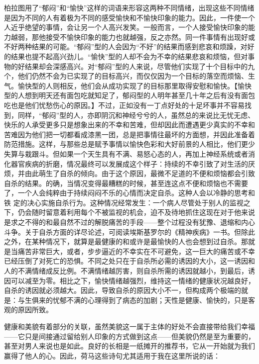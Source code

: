 \documentclass[12pt,oneside]{book}
\begin{document}
柏拉图用了“郁闷”和“愉快”这样的词语来形容这两种不同情绪，出现这些不同情绪是因为不同的人有着极为不同的感受愉快和不愉快印象的能力。因此，一件使一个人近乎绝望的事情，会让另一个人高兴发笑。一般而言，一个人接受愉快印象的能力越弱，那他接受不愉快印象的能力也就越强，反之亦然。同一件事情有出现好或不好两种结果的可能。“郁闷”型的人会因为“不好”的结果而感到悲哀和烦躁，对好的结果也提不起高兴劲儿。“愉快”型的人却不会为不幸的结果悲哀和烦恼，但对事物的好结果却会深感高兴。对“郁闷”型的人来说，尽管他们实现了十个目标中的九个，他们仍然不会为已实现了的目标高兴，而仅仅因为一个目标的落空而烦恼、生气。愉快型的人则相反，他们会从成功实现了的目标那里取得安慰和愉快。【愉快型的人想到明天还有面包吃就知足了，郁闷型的人明年甚至几十年之后有没有面包吃也是他们忧愁伤心的原因。】不过，正如没有一丁点好处的十足坏事并不容易找到，同样，“郁闷”型的人，亦即阴沉和神经兮兮的人，虽然总的来说比无忧无虑、快乐的人承受更多只是想象出来的不幸和苦难，但却因此而遭遇更少真实的不幸和苦难因为他们把一切都看成漆黑一团，总是把事情往最坏的方面想，并因此准备着防范措施。这样，与那些总是赋予事情以愉快色彩和大好前景的人相比，他们更少失算与栽跟斗。但如果一个天生具有不满、易怒心态的人，再加上神经系统或者消化器官疾病的折磨，情况最终可以发展成这个样子：持续的不幸引致了对生活的厌烦，并由此萌生了自杀的倾向。由于这个原因，最微不足道的不便和烦恼都会引致自杀的结果。的确，当情况变得最糟糕的时候，甚至连这点不便和烦恼也不需要了，一个人会纯粹由于持续闷闷不乐的心情而决定自杀。这种人会以冷静的思考和铁
定的决心实施自杀行为。这种情况经常发生：一个病人尽管处于别人的监视之下，仍会随时留意着利用每个不被监视的机会，迫不及待地抓住这现在对于他来说是求之不得的和最自然不过的解脱痛苦的手段——整个过程没有犹豫、退缩和内心斗争。关于自杀方面的详尽论述，可阅读埃斯基罗尔的《精神疾病》一书。但除此之外，在某种情况下，就算是最健康的和或许是最愉快的人也会想到过自杀。那就是当痛苦非常巨大，或者，步步逼近的不幸实在不可避免，这一巨大的痛苦或不幸已经压倒了对死亡的恐惧。不同之处只在于自杀所必需的诱因的大小，这一诱因和人的不满情绪成反比例。不满情绪越厉害，则自杀所需的诱因就越小，到最后，诱因可以减至为零。相比之下，愉快情绪越强烈，维持这一情绪的健康状况越良好，自杀的诱因就必须越大。因此，导致自杀的原因大小不一，但构成两个极端的就是：与生俱来的忧郁不满的心理得到了病态的加剧；天性是健康、愉快的，只是客观的原因所致。 

健康和美貌有着部分的关联，虽然美貌这一属于主体的好处不会直接带给我们幸福——它只是间接通过留给别人印象的方式做到这点——但美貌仍然是至为重要的，甚至对男人来说也是如此。良好的长相是一纸摊开的推荐书，它从一开始就为我们赢得了他人的心。因此，荷马这些诗句尤其适用于我在这里所说的话： 

 
\end{document}
